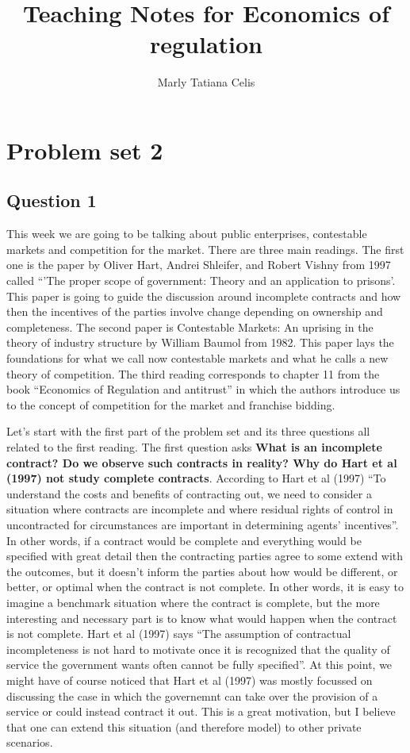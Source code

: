 \documentclass[11pt]{article} %
\title{Teaching Notes for Economics of regulation}
\author{Marly Tatiana Celis}
\begin{document}
\maketitle

\section{Problem set 2}

\subsection{Question 1}
This week we are going to be talking about public enterprises, contestable markets and competition for the market. There are three main readings. The first one is the paper by Oliver Hart, Andrei Shleifer, and Robert Vishny from 1997 called ``'The proper scope of government: Theory and an application to prisons'. This paper is going to guide the discussion around incomplete contracts and how then the incentives of the parties involve change depending on ownership and completeness. The second paper is Contestable Markets: An uprising in the theory of industry structure by William Baumol from 1982. This paper lays the foundations for what we call now contestable markets and what he calls a new theory of competition. The third reading corresponds to chapter 11 from the book ``Economics of Regulation and antitrust'' in which the authors introduce us to the concept of competition for the market and franchise bidding.

Let's start with the first part of the problem set and its three questions all related to the first reading. The first question asks \textbf{What is an incomplete contract? Do we observe such contracts in reality? Why do Hart et al (1997) not study complete contracts}. According to Hart et al (1997) ``To understand the costs and benefits of contracting out, we need to consider a situation where contracts are incomplete and where residual rights of control in uncontracted for circumstances are important in determining agents' incentives''. In other words, if a contract would be complete and everything would be specified with great detail then the contracting parties agree to some extend with the outcomes, but it doesn't inform the parties about how would be different, or better, or optimal when the contract is not complete. In other words, it is easy to imagine a benchmark situation where the contract is complete, but the more interesting and necessary part is to know what would happen when the contract is not complete. Hart et al (1997) says ``The assumption of contractual incompleteness is not hard to motivate once it is recognized that the quality of service the government wants often cannot be fully specified''.  At this point, we might have of course noticed that Hart et al (1997) was mostly focussed on discussing the case in which the governemnt can take over the provision of a service or could instead contract it out. This is a great motivation, but I believe that one can extend this situation (and therefore model) to other private scenarios.
\end{document}

